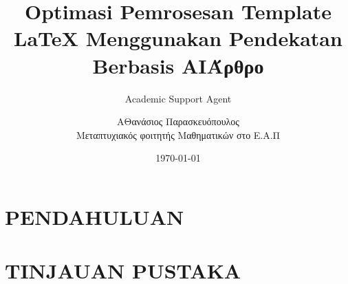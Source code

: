 \documentclass{article}
\title{Optimasi Pemrosesan Template LaTeX Menggunakan Pendekatan Berbasis AI}
\author{Academic Support Agent}
\date{\today}
\begin{document}
\maketitle

\begin{abstract}

\end{abstract}

\chapter{PENDAHULUAN}


\chapter{TINJAUAN PUSTAKA}




\usepackage{setspace}

\usepackage[a4paper,left=4cm, right=4cm, top=5.2cm, bottom=5.3cm]{geometry}
\usepackage{amsmath,amssymb}
\usepackage{array,graphicx}
\usepackage{booktabs}
\usepackage{pifont}
\usepackage{tabu}
\usepackage{longtable}
\usepackage{xcolor}
\usepackage{tcolorbox}
\usepackage{textcomp}

\usepackage[utf8]{inputenc}
\usepackage[greek,english]{babel}

\newcommand{\en}{\selectlanguage{english}}
\newcommand{\gr}{\selectlanguage{greek}}


    

\title{\textbf{\LARGE Άρθρο}\vspace{10mm}} 



\author{ 
            {ΑΘανάσιος Παρασκευόπουλος} 
            \\{Μεταπτυχιακός φοιτητής Μαθηματικών στο Ε.Α.Π}
            \\{{}}}
 
\date{}
\end{document}
